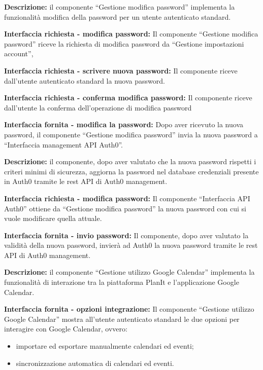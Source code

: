 \begin{listaPersonale}[]{}

    \textbf{Descrizione:} il componente “Gestione modifica password” implementa la funzionalità modifica della password per un utente autenticato standard.

    \textbf{Interfaccia richiesta - modifica password:} Il componente “Gestione modifica password” riceve la richiesta di modifica password da “Gestione impostazioni account”,

    \textbf{Interfaccia richiesta - scrivere nuova password:} Il componente riceve dall'utente autenticato standard la nuova password.

    \textbf{Interfaccia richiesta - conferma modifica password:} Il componente riceve dall'utente la conferma dell'operazione di modifica password

    \textbf{Interfaccia fornita - modifica la password:} Dopo aver ricevuto la nuova password, il componente “Gestione modifica password” invia la nuova password a “Interfaccia management API Auth0”.



    \textbf{Descrizione:} il componente, dopo aver valutato che la nuova password rispetti i criteri minimi di sicurezza, aggiorna la password nel database credenziali presente in Auth0 tramite le rest API di Auth0 management.

    \textbf{Interfaccia richiesta - modifica password:} Il componente “Interfaccia API Auth0” ottiene da “Gestione modifica password” la nuova password con cui si vuole modificare quella attuale.

    \textbf{Interfaccia fornita - invio password:} Il componente, dopo aver valutato la validità della nuova password, invierà ad Auth0 la nuova password tramite le rest API di Auth0 management.



    \textbf{Descrizione:} il componente “Gestione utilizzo Google Calendar” implementa la funzionalità di interazione tra la piattaforma PlanIt e l'applicazione Google Calendar.

    \textbf{Interfaccia fornita - opzioni integrazione:} Il componente “Gestione utilizzo Google Calendar” mostra all'utente autenticato standard le due opzioni per interagire con Google Calendar, ovvero:
    \begin{itemize}
        \item importare ed esportare manualmente calendari ed eventi;
        \item sincronizzazione automatica di calendari ed eventi.
    \end{itemize}


\end{listaPersonale}
